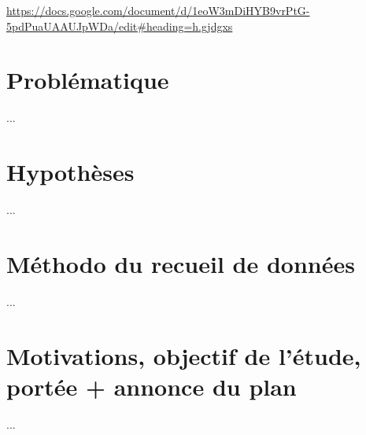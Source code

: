 \url{https://docs.google.com/document/d/1eoW3mDiHYB9vrPtG-5pdPuaUAAUJpWDa/edit\#heading=h.gjdgxs}
\section{Problématique}
...
\section{Hypothèses}
...
\section{Méthodo du recueil de données}
...
\section{Motivations, objectif de l'étude, portée + annonce du plan}
...






